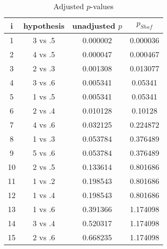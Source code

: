 \documentclass[a4paper,10pt]{article}
\begin{document}
\begin{landscape}
\begin{table}[!htp]
\centering\scriptsize
\begin{tabular}{cccc}
i&hypothesis&unadjusted $p$&$p_{Shaf}$\\
\hline1&3 vs .5&0.000002&0.000036\\
2&4 vs .5&0.000047&0.000467\\
3&2 vs .3&0.001308&0.013077\\
4&3 vs .6&0.005341&0.05341\\
5&1 vs .5&0.005341&0.05341\\
6&2 vs .4&0.010128&0.10128\\
7&4 vs .6&0.032125&0.224872\\
8&1 vs .3&0.053784&0.376489\\
9&5 vs .6&0.053784&0.376489\\
10&2 vs .5&0.133614&0.801686\\
11&1 vs .2&0.198543&0.801686\\
12&1 vs .4&0.198543&0.801686\\
13&1 vs .6&0.391366&1.174098\\
14&3 vs .4&0.520317&1.174098\\
15&2 vs .6&0.668235&1.174098\\
\hline
\end{tabular}
\caption{Adjusted $p$-values}
\end{table}

\end{landscape}
\end{document}
